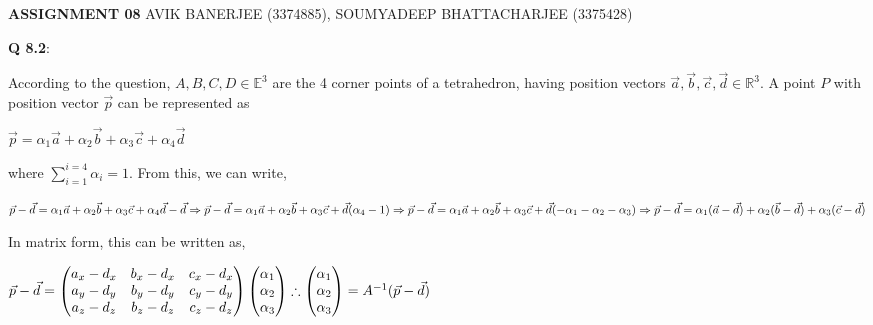 \documentclass{article}
\begin{document}
	\begin{center}
		\textbf{\LARGE ASSIGNMENT 08}\linebreak
		\Large AVIK BANERJEE (3374885), SOUMYADEEP BHATTACHARJEE (3375428)\linebreak
	\end{center}
\begin{flushleft}
	\textbf{Q 8.2}:\linebreak
\end{flushleft}
According to the question, $A, B, C, D \in \mathbb{E}^3$ are the 4 corner points of a tetrahedron, having position vectors $\vec{a}, \vec{b}, \vec{c}, \vec{d} \in \mathbb{R}^3$. A point $P$ with position vector $\vec{p}$ can be represented as
\begin{center}
	$\vec{p} = \alpha_1 \vec{a} + \alpha_2 \vec{b} + \alpha_3 \vec{c} + \alpha_4 \vec{d}$
\end{center} 
where $\sum_{i=1}^{i=4}\alpha_i = 1$.
From this, we can write,
\begin{center}
	$\vec{p} - \vec{d} = \alpha_1 \vec{a} + \alpha_2 \vec{b} + \alpha_3 \vec{c} + \alpha_4 \vec{d} - \vec{d} \linebreak
	\Rightarrow  \vec{p} - \vec{d} = \alpha_1 \vec{a} + \alpha_2 \vec{b} + \alpha_3 \vec{c} + \vec{d}(\alpha_4 - 1)\linebreak
	\Rightarrow \vec{p} - \vec{d} = \alpha_1 \vec{a} + \alpha_2 \vec{b} + \alpha_3 \vec{c} + \vec{d}(-\alpha_1 - \alpha_2 - \alpha_3)\linebreak
	\Rightarrow \vec{p} - \vec{d} = \alpha_1(\vec{a} - \vec{d}) + \alpha_2(\vec{b} - \vec{d}) + \alpha_3(\vec{c} - \vec{d})$\linebreak	
\end{center}
In matrix form, this can be written as,
\begin{center}
	$\vec{p} - \vec{d}=\begin{pmatrix}
	{a_x - d_x} & {b_x - d_x} & {c_x - d_x}\\
	{a_y - d_y} & {b_y - d_y} & {c_y - d_y}\\
	{a_z - d_z} & {b_z - d_z} & {c_z - d_z}\\
	\end{pmatrix} \begin{pmatrix}
		\alpha_1\\
		\alpha_2\\
		\alpha_3
	\end{pmatrix}\linebreak
	\therefore \begin{pmatrix}
	\alpha_1\\
	\alpha_2\\
	\alpha_3
	\end{pmatrix} = A^{-1} (\vec{p} - \vec{d})$
\end{center}
\end{document}
